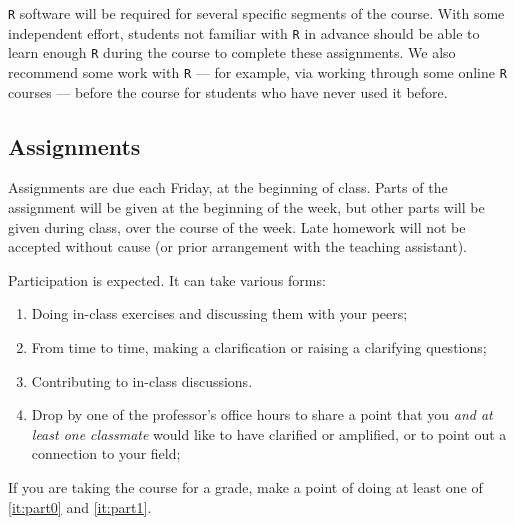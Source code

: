 \documentclass[12pt]{article}
\begin{document}
\begin{verse}  \end{verse}

\texttt{R} software will be required for several specific segments of the course. With some independent effort, students not familiar with \texttt{R} in advance should be able to learn enough \texttt{R} during the course to complete these assignments. We also recommend some work with \texttt{R} --- for example, via working through some online \texttt{R} courses --- before the course for students who have never used it before.


\subsection*{Assignments}
Assignments are due each Friday, at the beginning of
class. Parts of the assignment will be given at the beginning of the week, but other parts will be given during class, over the course of the week.  Late homework will not be accepted without cause (or prior arrangement with the teaching assistant).

Participation is expected. It can take various forms:
\begin{enumerate}
\item Doing in-class exercises and discussing them with your peers;
\item From time to time, making a clarification or raising a clarifying questions;
\item \label{it:part0} Contributing to in-class discussions.
\item \label{it:part1} Drop by one of the professor's office hours to share a point that you \textit{and at least one classmate} would like to have clarified or amplified, or to point out a connection to your field;
\end{enumerate}
If you are taking the course for a grade, make a point of doing at
least one of \ref{it:part0} and \ref{it:part1}. %
\end{document}
